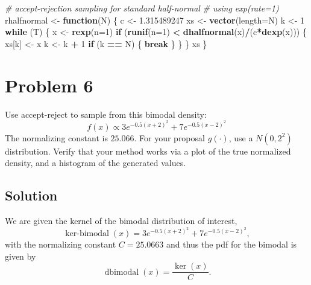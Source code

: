\documentclass[
  10pt,
  twocolumn]{article}
\newenvironment{Shaded}{\begin{snugshade}}{\end{snugshade}}
\newcommand{\AttributeTok}[1]{\textcolor[rgb]{0.13,0.29,0.53}{#1}}
\newcommand{\CommentTok}[1]{\textcolor[rgb]{0.56,0.35,0.01}{\textit{#1}}}
\newcommand{\ControlFlowTok}[1]{\textcolor[rgb]{0.13,0.29,0.53}{\textbf{#1}}}
\newcommand{\DecValTok}[1]{\textcolor[rgb]{0.00,0.00,0.81}{#1}}
\newcommand{\FloatTok}[1]{\textcolor[rgb]{0.00,0.00,0.81}{#1}}
\newcommand{\FunctionTok}[1]{\textcolor[rgb]{0.13,0.29,0.53}{\textbf{#1}}}
\newcommand{\NormalTok}[1]{#1}
\newcommand{\OtherTok}[1]{\textcolor[rgb]{0.56,0.35,0.01}{#1}}
\newcommand{\SpecialCharTok}[1]{\textcolor[rgb]{0.81,0.36,0.00}{\textbf{#1}}}
\begin{document}
\begin{Shaded}
\begin{Highlighting}[]
\CommentTok{\# accept{-}rejection sampling for standard half{-}normal}
\CommentTok{\# using exp(rate=1)}
\NormalTok{rhalfnormal }\OtherTok{\textless{}{-}} \ControlFlowTok{function}\NormalTok{(N)}
\NormalTok{\{}
\NormalTok{  c }\OtherTok{\textless{}{-}} \FloatTok{1.315489247}
\NormalTok{  xs }\OtherTok{\textless{}{-}} \FunctionTok{vector}\NormalTok{(}\AttributeTok{length=}\NormalTok{N)}
\NormalTok{  k }\OtherTok{\textless{}{-}} \DecValTok{1}
  \ControlFlowTok{while}\NormalTok{ (T)}
\NormalTok{  \{}
\NormalTok{    x }\OtherTok{\textless{}{-}} \FunctionTok{rexp}\NormalTok{(}\AttributeTok{n=}\DecValTok{1}\NormalTok{)}
    \ControlFlowTok{if}\NormalTok{ (}\FunctionTok{runif}\NormalTok{(}\AttributeTok{n=}\DecValTok{1}\NormalTok{) }\SpecialCharTok{\textless{}} \FunctionTok{dhalfnormal}\NormalTok{(x)}\SpecialCharTok{/}\NormalTok{(c}\SpecialCharTok{*}\FunctionTok{dexp}\NormalTok{(x)))}
\NormalTok{    \{}
\NormalTok{      xs[k] }\OtherTok{\textless{}{-}}\NormalTok{ x}
\NormalTok{      k }\OtherTok{\textless{}{-}}\NormalTok{ k }\SpecialCharTok{+} \DecValTok{1}
      \ControlFlowTok{if}\NormalTok{ (k }\SpecialCharTok{==}\NormalTok{ N) \{ }\ControlFlowTok{break}\NormalTok{ \}}
\NormalTok{    \}}
\NormalTok{  \}}
\NormalTok{  xs}
\NormalTok{\}}
\end{Highlighting}
\end{Shaded}

\hypertarget{problem-6}{%
\section{Problem 6}\label{problem-6}}

Use accept-reject to sample from this bimodal density: \[
  f(x) \propto 3 e^{-0.5(x+2)^2} + 7 e^{-0.5(x-2)^2}
\] The normalizing constant is \(25.066\). For your proposal \(g(·)\),
use a \(N(0, 2^2)\) distribution. Verify that your method works via a
plot of the true normalized density, and a histogram of the generated
values.

\hypertarget{solution-3}{%
\subsection{Solution}\label{solution-3}}

We are given the kernel of the bimodal distribution of interest, \[
  \operatorname{ker-bimodal}(x) = 3 e^{-0.5(x+2)^2} + 7 e^{-0.5(x-2)^2},
\] with the normalizing constant \(C = 25.0663\) and thus the pdf for
the bimodal is given by \[
  \operatorname{dbimodal}(x) = \frac{\operatorname{ker}(x)}{C}.
\]
\end{document}

